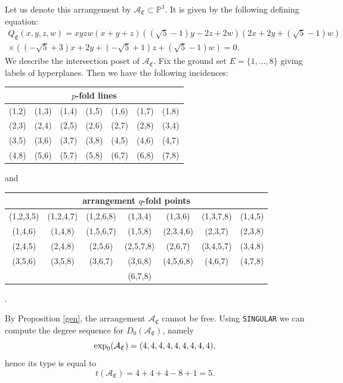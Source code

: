 \documentclass[11pt]{article}
\theoremstyle{plain}
\theoremstyle{definition}
\begin{document}
\noindent
{}
\vskip 5pt
\noindent
Let us denote this arrangement by $\mathcal{A}_{\mathfrak{C}} \subset \mathbb{P}^{3}$. It is given by the following defining equation:
\begin{multline*}
 Q_{\mathfrak{C}}(x,y,z,w) = xyzw(x+y+z)((\sqrt{5}-1)y-2z+2w) (2x+2y+(\sqrt{5}-1)w) \\
 \times ((-\sqrt{5}+3)x+2y+(-\sqrt{5}+1)z+(\sqrt{5}-1)w)= 0.   
\end{multline*}
We describe the intersection poset of $\mathcal{A}_{\mathfrak{C}}$. Fix the ground set $E= \{1, \ldots , 8\}$ giving labels of hyperplanes. Then we have the following incidences:
\begin{center}
\begin{tabular}{ c c c c c c c }
\multicolumn{7}{c}{$p$-fold lines} \\\hline \hline
 (1,2) & (1,3) & (1,4) & (1,5) & (1,6) & (1,7) & (1,8) \\
 (2,3) & (2,4) & (2,5) & (2,6) & (2,7) & (2,8) & (3,4) \\
 (3,5) & (3,6) & (3,7) & (3,8) & (4,5) & (4,6) & (4,7) \\
 (4,8) & (5,6) & (5,7) & (5,8) & (6,7) & (6,8) & (7,8)
\end{tabular}
\end{center}
and 
\begin{center}
\begin{tabular}{ c c c c c c c }
\multicolumn{7}{c}{arrangement $q$-fold points} \\ \hline \hline 
 (1,2,3,5) &  (1,2,4,7) & (1,2,6,8) & (1,3,4) & (1,3,6) & (1,3,7,8) & (1,4,5) \\
 (1,4,6) & (1,4,8) & (1,5,6,7) & (1,5,8) & (2,3,4,6) & (2,3,7) & (2,3,8) \\
 (2,4,5) & (2,4,8) & (2,5,6) & (2,5,7,8) & (2,6,7) & (3,4,5,7) & (3,4,8) \\
 (3,5,6) & (3,5,8) & (3,6,7) & (3,6,8) & (4,5,6,8) & (4,6,7) & (4,7,8)\\
 & & & (6,7,8) & & &

\end{tabular}.
\end{center}
By Proposition \ref{gen}, the arrangement $\mathcal{A}_{\mathfrak{C}}$ cannot be free. Using \texttt{SINGULAR} we can compute the degree sequence for $D_{0}(\mathcal{A}_{\mathfrak{C}})$, namely
$${\rm exp}_{0}(\mathcal{A}_{\mathfrak{C}}) = (4,4,4,4,4,4,4,4,4),$$
hence its type is equal to
$$t(\mathcal{A}_{\mathfrak{C}})= 4+4+4-8+1=5.$$
\end{document}
